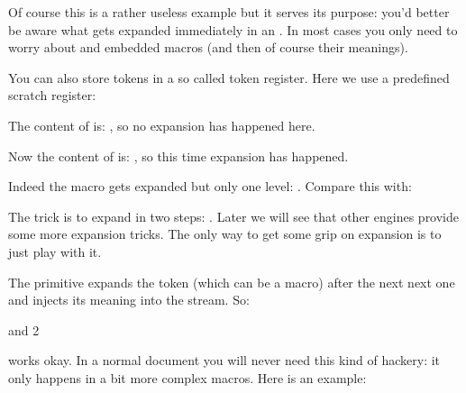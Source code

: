 Of course this is a rather useless example but it serves its purpose: you'd better
be aware what gets expanded immediately in an \type {\edef}. In most cases you
only need to worry about \type {\the} and embedded macros (and then of course
their meanings).

\def\MyShow{\quotation {\strut \inlinebuffer \expandafter \typ \expandafter
{\the\scratchtoks}\strut}}

You can also store tokens in a so called token register. Here we use a predefined
scratch register:

\startbuffer
\def\MyMacroA{ and }
\def\MyMacroB{1\MyMacroA 2}
\scratchtoks {\MyMacroA}
\stopbuffer

\typebuffer[option=TEX]

The content of \type {\scratchtoks} is: \MyShow, so no expansion has happened
here.

\startbuffer
\def\MyMacroA{ and }
\def\MyMacroB{1\MyMacroA 2}
\scratchtoks \expandafter {\MyMacroA}
\stopbuffer

\typebuffer[option=TEX]

Now the content of \type {\scratchtoks} is: \MyShow, so this time expansion has
happened.

\startbuffer
\def\MyMacroA{ and }
\def\MyMacroB{1\MyMacroA 2}
\scratchtoks \expandafter {\MyMacroB}
\stopbuffer

\typebuffer[option=TEX]

Indeed the macro gets expanded but only one level: \MyShow. Compare this with:

\startbuffer
\def\MyMacroA{ and }
\edef\MyMacroB{1\MyMacroA 2}
\scratchtoks \expandafter {\MyMacroB}
\stopbuffer

\typebuffer[option=TEX]

The trick is to expand in two steps: \MyShow. Later we will see that other
engines provide some more expansion tricks. The only way to get some grip on
expansion is to just play with it.

The \type {\expandafter} primitive expands the token (which can be a macro) after
the next next one and injects its meaning into the stream. So:

\starttyping[option=TEX]
\expandafter \MyMacroA \MyMacroB
\stoptyping

works okay. In a normal document you will never need this kind of hackery: it
only happens in a bit more complex macros. Here is an example:

\startbuffer[a]
\bgroup
\advance{}
\egroup
\the\scratchcounter
\stopbuffer

